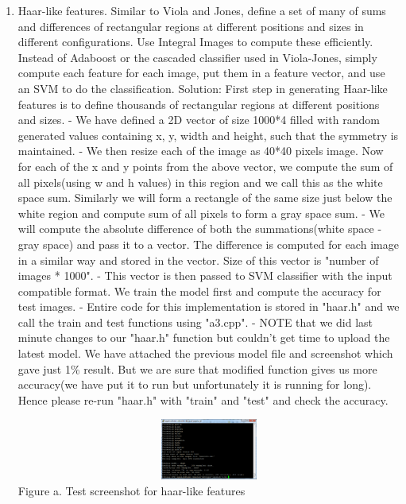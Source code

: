 \documentclass{article}
\begin{document}
\begin{enumerate}
		\item Haar-like features. Similar to Viola and Jones, define a set of many of sums and differences of rectangular regions at different positions and sizes in different configurations. Use Integral Images to compute these efficiently. Instead of Adaboost or the cascaded classifier used in Viola-Jones, simply compute each feature for each image, put them in a feature vector, and use an SVM to do the classification. \newline
		Solution: First step in generating Haar-like features is to define thousands of rectangular regions at different positions and sizes. \newline
		- We have defined a 2D vector of size 1000*4 filled with random generated values containing x, y, width and height, such that the symmetry is maintained. \newline		
		- We then resize each of the image as 40*40 pixels image. Now for each of the x and y points from the above vector, we compute the sum of all pixels(using w and h values) in this region and we call this as the white space sum. Similarly we will form a rectangle of the same size just below the white region and compute sum of all pixels to form a gray space sum. \newline 
		- We will compute the absolute difference of both the summations(white space - gray space) and pass it to a vector. The difference is computed for each image in a similar way and stored in the vector. Size of this vector is "number of images * 1000". \newline 
		- This vector is then passed to SVM classifier with the input compatible format. We train the model first and compute the accuracy for test images. \newline
		- Entire code for this implementation is stored in "haar.h" and we call the train and test functions using "a3.cpp". \newline
		- NOTE that we did last minute changes to our "haar.h" function but couldn't get time to upload the latest model. We have attached the previous model file and screenshot which gave just 1\% result. But we are sure that modified function gives us more accuracy(we have put it to run but unfortunately it is running for long). Hence please re-run "haar.h" with "train" and "test" and check the accuracy.
		\begin{center}
			\includegraphics[width=14cm, height=2cm]{test_haar.png} \\
			Figure a. Test screenshot for haar-like features
		\end{center}
		

\end{enumerate}
\end{document}
